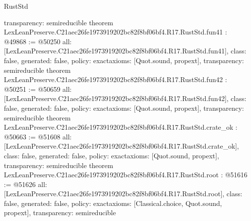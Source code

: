 \begin{lexlean}{RustStd}
\begin{coremodule}
{  transparency: semireducible
}
theorem LexLeanPreserve.C21aec26fe1973919202bc82f8bf06bf4.R17.RustStd.fun41 : @49868 := @50250 {
  all: [LexLeanPreserve.C21aec26fe1973919202bc82f8bf06bf4.R17.RustStd.fun41],
  class: false,
  generated: false,
  policy: exact{axioms: [Quot.sound, propext]},
  transparency: semireducible
}
theorem LexLeanPreserve.C21aec26fe1973919202bc82f8bf06bf4.R17.RustStd.fun42 : @50251 := @50659 {
  all: [LexLeanPreserve.C21aec26fe1973919202bc82f8bf06bf4.R17.RustStd.fun42],
  class: false,
  generated: false,
  policy: exact{axioms: [Quot.sound, propext]},
  transparency: semireducible
}
theorem LexLeanPreserve.C21aec26fe1973919202bc82f8bf06bf4.R17.RustStd.crate_ok : @50663 := @51608 {
  all: [LexLeanPreserve.C21aec26fe1973919202bc82f8bf06bf4.R17.RustStd.crate_ok],
  class: false,
  generated: false,
  policy: exact{axioms: [Quot.sound, propext]},
  transparency: semireducible
}
theorem LexLeanPreserve.C21aec26fe1973919202bc82f8bf06bf4.R17.RustStd.root : @51616 := @51626 {
  all: [LexLeanPreserve.C21aec26fe1973919202bc82f8bf06bf4.R17.RustStd.root],
  class: false,
  generated: false,
  policy: exact{axioms: [Classical.choice, Quot.sound, propext]},
  transparency: semireducible
}


\end{coremodule}
\end{lexlean}
